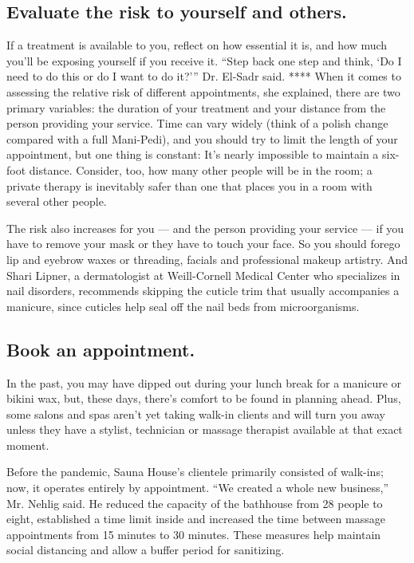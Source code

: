 \hypertarget{evaluate-the-risk-to-yourself-and-others}{%
\subsection{Evaluate the risk to yourself and
others.}\label{evaluate-the-risk-to-yourself-and-others}}

If a treatment is available to you, reflect on how essential it is, and
how much you'll be exposing yourself if you receive it. ``Step back one
step and think, `Do I need to do this or do I want to do it?''' Dr.
El-Sadr said. **** When it comes to assessing the relative risk of
different appointments, she explained, there are two primary variables:
the duration of your treatment and your distance from the person
providing your service. Time can vary widely (think of a polish change
compared with a full Mani-Pedi), and you should try to limit the length
of your appointment, but one thing is constant: It's nearly impossible
to maintain a six-foot distance. Consider, too, how many other people
will be in the room; a private therapy is inevitably safer than one that
places you in a room with several other people.

The risk also increases for you --- and the person providing your
service --- if you have to remove your mask or they have to touch your
face. So you should forego lip and eyebrow waxes or threading, facials
and professional makeup artistry. And Shari Lipner, a dermatologist at
Weill-Cornell Medical Center who specializes in nail disorders,
recommends skipping the cuticle trim that usually accompanies a
manicure, since cuticles help seal off the nail beds from
microorganisms.

\hypertarget{book-an-appointment}{%
\subsection{Book an appointment.}\label{book-an-appointment}}

In the past, you may have dipped out during your lunch break for a
manicure or bikini wax, but, these days, there's comfort to be found in
planning ahead. Plus, some salons and spas aren't yet taking walk-in
clients and will turn you away unless they have a stylist, technician or
massage therapist available at that exact moment.

Before the pandemic, Sauna House's clientele primarily consisted of
walk-ins; now, it operates entirely by appointment. ``We created a whole
new business,'' Mr. Nehlig said. He reduced the capacity of the
bathhouse from 28 people to eight, established a time limit inside and
increased the time between massage appointments from 15 minutes to 30
minutes. These measures help maintain social distancing and allow a
buffer period for sanitizing.

